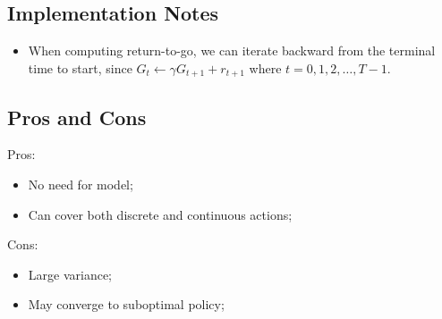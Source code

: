     \subsection{Implementation Notes}
        \begin{itemize}
            \item When computing return-to-go, we can iterate backward from the terminal time to start, since $G_t \leftarrow \gamma G_{t+1} + r_{t+1}$ where $t=0, 1, 2,\dots,T-1$.
        \end{itemize}
    \subsection{Pros and Cons}
        Pros:
        \begin{itemize}
            \item No need for model;
            \item Can cover both discrete and continuous actions;
        \end{itemize}
        Cons:
        \begin{itemize}
            \item Large variance;
            \item May converge to suboptimal policy;
        \end{itemize}